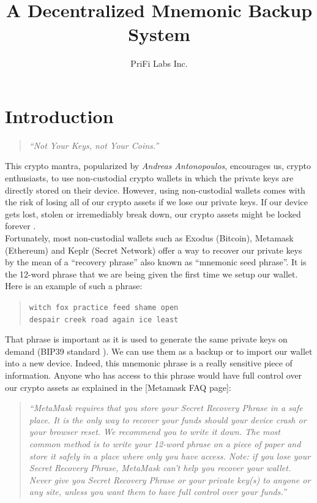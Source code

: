 \documentclass[12pt]{article}
\title{A Decentralized Mnemonic Backup System}
\author{PriFi Labs Inc.}
\date{}
\begin{document}
\maketitle

\begin{abstract}

\end{abstract}

\section{Introduction}

\begin{quote}
{\em ``Not Your Keys, not Your Coins.''}
\end{quote}

This crypto mantra, popularized by {\em Andreas Antonopoulos}, encourages us, crypto enthusiasts, to use non-custodial crypto wallets in which the private keys are directly stored on their device. However, using non-custodial wallets comes with the risk of losing all of our crypto assets if we lose our private keys. If our device gets lost, stolen or irremediably break down, our crypto assets might be locked forever \cite{LostPasswords}.\\

Fortunately, most non-custodial wallets such as Exodus (Bitcoin), Metamask (Ethereum) and Keplr (Secret Network) offer a way to recover our private keys by the mean of a ``recovery phrase'' also known as ``mnemonic seed phrase''. It is the 12-word phrase that we are being given the first time we setup our wallet. Here is an example of such a phrase: 

\begin{quote}
\begin{center}
{\tt witch fox practice feed shame open}\\
{\tt despair creek road again ice least}
\end{center}
\end{quote}

That phrase is important as it is used to generate the same private keys on demand (BIP39 standard \cite{BIP39}). We can use them as a backup or to import our wallet into a new device. Indeed, this mnemonic phrase is a really sensitive piece of information. Anyone who has access to this phrase would have full control over our crypto assets as explained in the [Metamask FAQ page]\cite{MetamaskFAQ}:

\begin{quote}
{\em ``MetaMask requires that you store your Secret Recovery Phrase in a safe place. It is the only way to recover your funds should your device crash or your browser reset. We recommend you to write it down. The most common method is to write your 12-word phrase on a piece of paper and store it safely in a place where only you have access. Note: if you lose your Secret Recovery Phrase, MetaMask can’t help you recover your wallet. Never give you Secret Recovery Phrase or your private key(s) to anyone or any site, unless you want them to have full control over your funds.''}\\
\end{quote}
\end{document}
